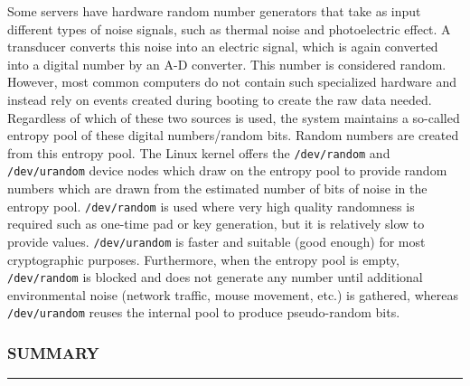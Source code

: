 \begin{Shaded}
\begin{Highlighting}[]
\NormalTok{$ } 
\NormalTok{$ } 
\NormalTok{$ } 
\end{Highlighting}
\end{Shaded}

Some servers have hardware random number generators that take as input
different types of noise signals, such as thermal noise and
photoelectric effect. A transducer converts this noise into an electric
signal, which is again converted into a digital number by an A-D
converter. This number is considered random. However, most common
computers do not contain such specialized hardware and instead rely on
events created during booting to create the raw data needed. Regardless
of which of these two sources is used, the system maintains a so-called
entropy pool of these digital numbers/random bits. Random numbers are
created from this entropy pool. The Linux kernel offers the
\texttt{/dev/random} and \texttt{/dev/urandom} device nodes which draw
on the entropy pool to provide random numbers which are drawn from the
estimated number of bits of noise in the entropy pool.
\texttt{/dev/random} is used where very high quality randomness is
required such as one-time pad or key generation, but it is relatively
slow to provide values. \texttt{/dev/urandom} is faster and suitable
(good enough) for most cryptographic purposes. Furthermore, when the
entropy pool is empty, \texttt{/dev/random} is blocked and does not
generate any number until additional environmental noise (network
traffic, mouse movement, etc.) is gathered, whereas
\texttt{/dev/urandom} reuses the internal pool to produce pseudo-random
bits.

\subsubsection{SUMMARY}\label{summary-14}

\begin{center}\rule{3in}{0.4pt}\end{center}


